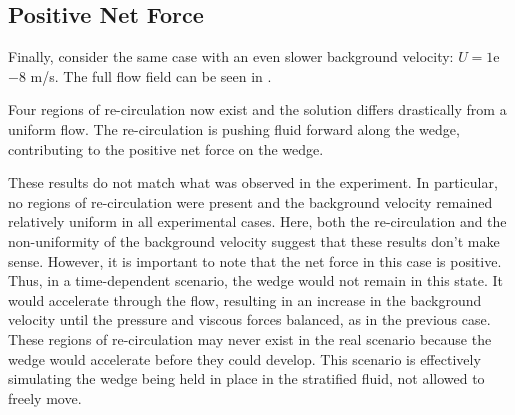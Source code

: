 \documentclass[12pt]{article}
\begin{document}
\subsection{Positive Net Force}

Finally, consider the same case with an even slower background velocity:  $U=1$e$-8$ m/s. The full flow field can be seen in .


Four regions of re-circulation now exist and the solution differs drastically from a uniform flow. The re-circulation is pushing fluid forward along the wedge, contributing to the positive net force on the wedge.

These results do not match what was observed in the experiment. In particular, no regions of re-circulation were present and the background velocity remained relatively uniform in all experimental cases. Here, both the re-circulation and the non-uniformity of the background velocity suggest that these results don't make sense. However, it is important to note that the net force in this case is positive. Thus, in a time-dependent scenario, the wedge would not remain in this state. It would accelerate through the flow, resulting in an increase in the background velocity until the pressure and viscous forces balanced, as in the previous case. These regions of re-circulation may never exist in the real scenario because the wedge would accelerate before they could develop. This scenario is effectively simulating the wedge being held in place in the stratified fluid, not allowed to freely move.

\end{document}

